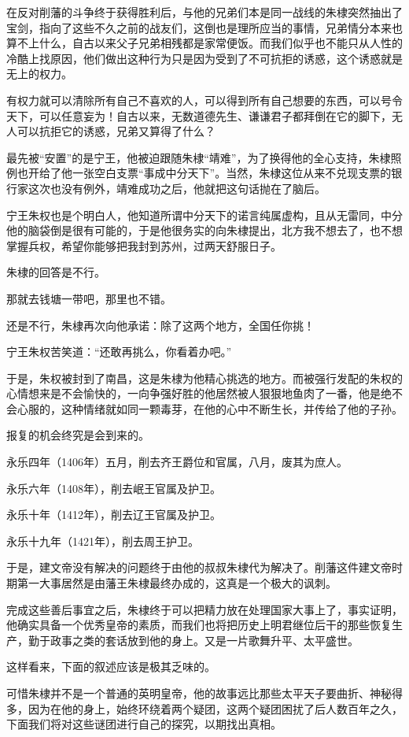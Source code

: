 \begin{multicols}{\theparacolNo}
在反对削藩的斗争终于获得胜利后，与他的兄弟们本是同一战线的朱棣突然抽出了宝剑，指向了这些不久之前的战友们，这倒也是理所应当的事情，兄弟情分本来也算不上什么，自古以来父子兄弟相残都是家常便饭。而我们似乎也不能只从人性的冷酷上找原因，他们做出这种行为只是因为受到了不可抗拒的诱惑，这个诱惑就是无上的权力。

有权力就可以清除所有自己不喜欢的人，可以得到所有自己想要的东西，可以号令天下，可以任意妄为！自古以来，无数道德先生、谦谦君子都拜倒在它的脚下，无人可以抗拒它的诱惑，兄弟又算得了什么？

最先被“安置”的是宁王，他被迫跟随朱棣“靖难”，为了换得他的全心支持，朱棣照例也开给了他一张空白支票“事成中分天下”。当然，朱棣这位从来不兑现支票的银行家这次也没有例外，靖难成功之后，他就把这句话抛在了脑后。

宁王朱权也是个明白人，他知道所谓中分天下的诺言纯属虚构，且从无雷同，中分他的脑袋倒是很有可能的，于是他很务实的向朱棣提出，北方我不想去了，也不想掌握兵权，希望你能够把我封到苏州，过两天舒服日子。

朱棣的回答是不行。

那就去钱塘一带吧，那里也不错。

还是不行，朱棣再次向他承诺：除了这两个地方，全国任你挑！

宁王朱权苦笑道：“还敢再挑么，你看着办吧。”

于是，朱权被封到了南昌，这是朱棣为他精心挑选的地方。而被强行发配的朱权的心情想来是不会愉快的，一向争强好胜的他居然被人狠狠地鱼肉了一番，他是绝不会心服的，这种情绪就如同一颗毒芽，在他的心中不断生长，并传给了他的子孙。

报复的机会终究是会到来的。

永乐四年（1406年）五月，削去齐王爵位和官属，八月，废其为庶人。

永乐六年（1408年），削去岷王官属及护卫。

永乐十年（1412年），削去辽王官属及护卫。

永乐十九年（1421年），削去周王护卫。

于是，建文帝没有解决的问题终于由他的叔叔朱棣代为解决了。削藩这件建文帝时期第一大事居然是由藩王朱棣最终办成的，这真是一个极大的讽刺。

完成这些善后事宜之后，朱棣终于可以把精力放在处理国家大事上了，事实证明，他确实具备一个优秀皇帝的素质，而我们也将把历史上明君继位后干的那些恢复生产，勤于政事之类的套话放到他的身上。又是一片歌舞升平、太平盛世。

这样看来，下面的叙述应该是极其乏味的。

可惜朱棣并不是一个普通的英明皇帝，他的故事远比那些太平天子要曲折、神秘得多，因为在他的身上，始终环绕着两个疑团，这两个疑团困扰了后人数百年之久，下面我们将对这些谜团进行自己的探究，以期找出真相。


\end{multicols}
